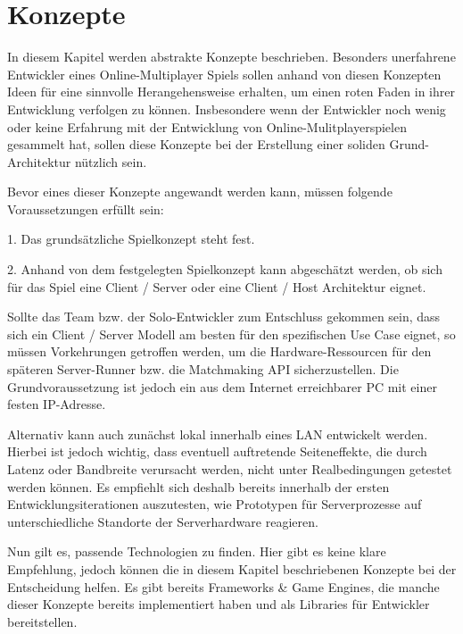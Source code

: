 \chapter{Konzepte}
\label{sec:konzepte}

In diesem Kapitel werden abstrakte Konzepte beschrieben. Besonders unerfahrene Entwickler eines Online-Multiplayer Spiels sollen anhand von diesen Konzepten Ideen für eine sinnvolle Herangehensweise erhalten, um einen roten Faden in ihrer Entwicklung verfolgen zu können. Insbesondere wenn der Entwickler noch wenig oder keine Erfahrung mit der Entwicklung von Online-Mulitplayerspielen gesammelt hat, sollen diese Konzepte bei der Erstellung einer soliden Grund-Architektur nützlich sein.

Bevor eines dieser Konzepte angewandt werden kann, müssen folgende Voraussetzungen erfüllt sein:

1. Das grundsätzliche Spielkonzept steht fest.

2. Anhand von dem festgelegten Spielkonzept kann abgeschätzt werden, ob sich für das Spiel eine Client / Server oder eine Client / Host Architektur eignet.

Sollte das Team bzw. der Solo-Entwickler zum Entschluss gekommen sein, dass sich ein Client / Server Modell am besten für den spezifischen Use Case eignet, so müssen Vorkehrungen getroffen werden, um die Hardware-Ressourcen für den späteren Server-Runner bzw. die Matchmaking API sicherzustellen. Die Grundvoraussetzung ist jedoch ein aus dem Internet erreichbarer PC mit einer festen IP-Adresse. 

Alternativ kann auch zunächst lokal innerhalb eines LAN \cite{Wikipedia.2022} entwickelt werden. Hierbei ist jedoch wichtig, dass eventuell auftretende Seiteneffekte, die durch Latenz \cite{Wikipedia.2022b} oder Bandbreite \cite{Wikipedia.2019b} verursacht werden, nicht unter Realbedingungen getestet werden können. Es empfiehlt sich deshalb bereits innerhalb der ersten Entwicklungsiterationen auszutesten, wie Prototypen für Serverprozesse auf unterschiedliche Standorte der Serverhardware reagieren. 

Nun gilt es, passende Technologien zu finden. Hier gibt es keine klare Empfehlung, jedoch können die in diesem Kapitel beschriebenen Konzepte bei der Entscheidung helfen. Es gibt bereits Frameworks \& Game Engines, die manche dieser Konzepte bereits implementiert haben und als Libraries für Entwickler bereitstellen.

\cite{MFatihMAR.2021}

